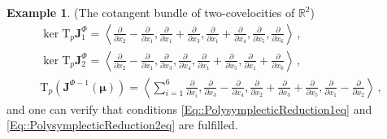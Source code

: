 \documentclass[11pt]{article}
\theoremstyle{plain}
\theoremstyle{definition}
\newtheorem{example}[theorem]{Example}
\newcommand{\R}{\mathbb{R}}
\newcommand{\T}{\mathrm{T}}
\numberwithin{equation}{section}
\begin{document}
\begin{example}{(The cotangent bundle of two-covelocities of $\R^2$)}
\begin{gather*}
\ker \T_p\mathbf{J}^{\Phi}_1=\left\langle \frac{\partial}{\partial x_2}-\frac{\partial}{\partial x_1},\frac{\partial}{\partial x_1}+\frac{\partial}{\partial x_3},\frac{\partial}{\partial x_1}+\frac{\partial}{\partial x_4},\frac{\partial}{\partial x_5},\frac{\partial}{\partial x_6} \right\rangle \,,\\
\ker \T_p\mathbf{J}^{\Phi}_{2}=\left\langle  \frac{\partial}{\partial x_2}-\frac{\partial}{\partial x_1},\frac{\partial}{\partial x_3},\frac{\partial}{\partial x_4},\frac{\partial}{\partial x_1}+\frac{\partial}{\partial x_5},\frac{\partial}{\partial x_1}+\frac{\partial}{\partial x_6}\right\rangle \,,\\
\T_p(\mathbf{J}^{\Phi-1}(\boldsymbol{\mu}))=\left\langle  \sum^6_{i=1}\frac{\partial}{\partial x_i},\frac{\partial}{\partial x_3}-\frac{\partial}{\partial x_4},\frac{\partial}{\partial x_2}+\frac{\partial}{\partial x_3}+\frac{\partial}{\partial x_5},\frac{\partial}{\partial x_1}-\frac{\partial}{\partial x_2}\right\rangle \,,
\end{gather*}
and one can verify that conditions \eqref{Eq::PolysymplecticReduction1eq} and \eqref{Eq::PolysymplecticReduction2eq} are fulfilled.


\end{example}
\end{document}
